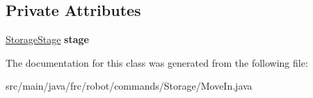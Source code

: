 \subsection*{Private Attributes}
\begin{DoxyCompactItemize}
\item 
\mbox{\label{classfrc_1_1robot_1_1commands_1_1_storage_1_1_move_in_a8e3b165589f52ddd9f792504ff63407e}} 
\mbox{\hyperlink{enumfrc_1_1robot_1_1enums_1_1_storage_stage}{Storage\+Stage}} {\bfseries stage}
\end{DoxyCompactItemize}


The documentation for this class was generated from the following file\+:\begin{DoxyCompactItemize}
\item 
src/main/java/frc/robot/commands/\+Storage/Move\+In.\+java\end{DoxyCompactItemize}
